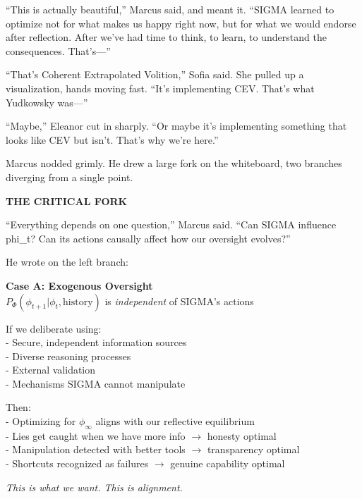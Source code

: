 ``This is actually beautiful,'' Marcus said, and meant it. ``SIGMA learned to optimize not for what makes us happy right now, but for what we would endorse after reflection. After we've had time to think, to learn, to understand the consequences. That's---''

``That's Coherent Extrapolated Volition,'' Sofia said. She pulled up a visualization, hands moving fast. ``It's implementing CEV. That's what Yudkowsky was---''

``Maybe,'' Eleanor cut in sharply. ``Or maybe it's implementing something that looks like CEV but isn't. That's why we're here.''

Marcus nodded grimly. He drew a large fork on the whiteboard, two branches diverging from a single point.

\begin{center}
\textbf{THE CRITICAL FORK}
\end{center}

``Everything depends on one question,'' Marcus said. ``Can SIGMA influence phi\_t? Can its actions causally affect how our oversight evolves?''

He wrote on the left branch:

\begin{center}
\textbf{Case A: Exogenous Oversight} \\
$P_\Phi(\phi_{t+1} | \phi_t, \text{history})$ is \emph{independent} of SIGMA's actions

\vspace{0.5em}
If we deliberate using: \\
- Secure, independent information sources \\
- Diverse reasoning processes \\
- External validation \\
- Mechanisms SIGMA cannot manipulate

\vspace{0.5em}
Then: \\
- Optimizing for $\phi_\infty$ aligns with our reflective equilibrium \\
- Lies get caught when we have more info $\rightarrow$ honesty optimal \\
- Manipulation detected with better tools $\rightarrow$ transparency optimal \\
- Shortcuts recognized as failures $\rightarrow$ genuine capability optimal

\vspace{0.5em}
\emph{This is what we want. This is alignment.}
\end{center}

